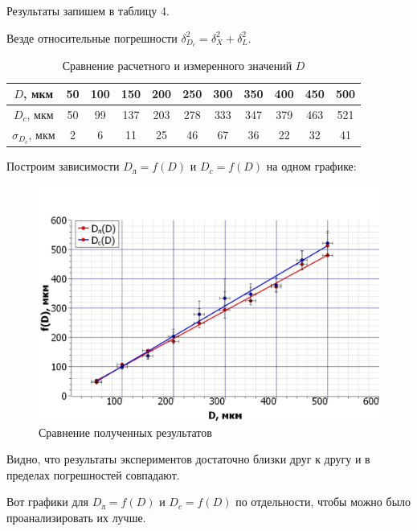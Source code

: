 \documentclass[a4paper,12pt]{article} %
\begin{document}
	Результаты запишем в таблицу 4.
	
	Везде относительные погрешности $\delta_{D_c}^2 = \delta_X^2 + \delta_L^2$.
	
	\newpage
	
	\begin{table}[h!]
		\centering
		\begin{tabular}{|c|c|c|c|c|c|c|c|c|c|c|}
			\hline
			$D$, мкм            & 50 & 100 & 150 & 200 & 250 & 300 & 350 & 400 & 450 & 500 \\ \hline
			$D_c$, мкм          & 50 & 99  & 137 & 203 & 278 & 333 & 347 & 379 & 463 & 521 \\ \hline
			$\sigma_{D_c}$, мкм & 2  & 6   & 11  & 25  & 46  & 67  & 36  & 22  & 32  & 41  \\ \hline
		\end{tabular}
	\caption{Сравнение расчетного и измеренного значений $D$}
	\end{table}

	Построим зависимости $D_{\text{л}} = f(D)$ и $D_c = f(D)$ на одном графике:
	
	\begin{figure}[h!]
		\centering
		\includegraphics[scale=0.7]{Pictures/График}
		\caption{Сравнение полученных результатов}
	\end{figure}

	Видно, что результаты экспериментов достаточно близки друг к другу и в пределах погрешностей совпадают.
	
	
	\newpage
	
	Вот графики для $D_{\text{л}} = f(D)$ и $D_c = f(D)$ по отдельности, чтобы можно было проанализировать их лучше.
	
\end{document}
